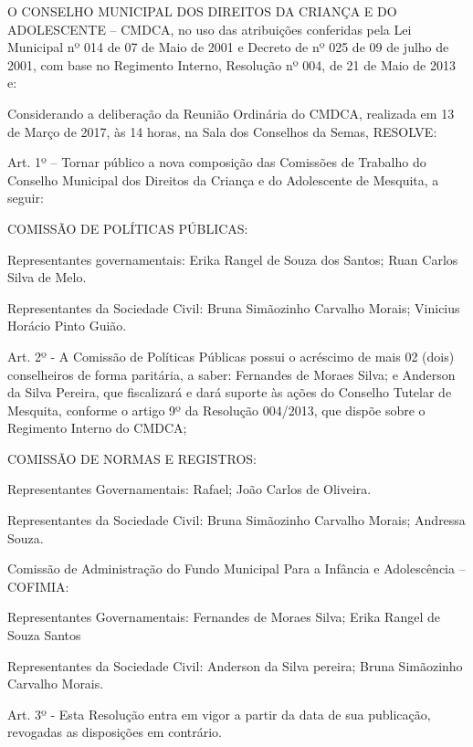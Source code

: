 \documentclass{doliberto}
\begin{document}
O  CONSELHO  MUNICIPAL  DOS  DIREITOS  DA  CRIANÇA  E 
DO  ADOLESCENTE  –  CMDCA,  no  uso  das  atribuições 
conferidas pela Lei Municipal nº 014 de 07 de Maio de 2001 
e  Decreto  de  nº  025  de  09  de  julho  de  2001,  com  base  no 
Regimento  Interno,  Resolução  nº  004,  de  21  de  Maio  de 
2013 e:  

Considerando  a  deliberação  da  Reunião  Ordinária  do 
CMDCA, realizada em 13 de Março de 2017, às 14 horas, na 
Sala dos Conselhos da Semas, RESOLVE:   

Art. 1º – Tornar público a nova composição das Comissões 
de Trabalho do Conselho Municipal dos Direitos da Criança 
e do Adolescente de Mesquita, a seguir: 

COMISSÃO DE POLÍTICAS PÚBLICAS:  
 
Representantes  governamentais:  Erika  Rangel  de  Souza 
dos Santos; Ruan Carlos Silva de Melo.  
 
Representantes  da  Sociedade  Civil:  Bruna  Simãozinho 
Carvalho Morais; Vinicius Horácio Pinto Guião.  
 
Art.  2º  -  A  Comissão  de  Políticas  Públicas  possui  o 
acréscimo  de  mais  02  (dois)  conselheiros  de  forma 
paritária, a saber: Fernandes de Moraes Silva; e Anderson da 
Silva  Pereira,  que  fiscalizará  e  dará  suporte  às  ações  do 
Conselho  Tutelar  de  Mesquita,  conforme  o  artigo  9º  da 
Resolução  004/2013,  que  dispõe  sobre  o  Regimento 
Interno do CMDCA;  
 
COMISSÃO DE NORMAS E REGISTROS: 
 
Representantes  Governamentais: 
Rafael; João Carlos de Oliveira. 
 
Representantes  da  Sociedade  Civil:  Bruna  Simãozinho 
Carvalho Morais; Andressa Souza. 
 
Comissão de Administração do Fundo Municipal Para a 
Infância e Adolescência – COFIMIA: 
 
Representantes  Governamentais:  Fernandes  de  Moraes 
Silva; Erika Rangel de Souza Santos 
 
Representantes  da  Sociedade  Civil:  Anderson  da  Silva 
pereira; Bruna Simãozinho Carvalho Morais. 
 
Art. 3º - Esta Resolução entra em vigor a partir da data de 
sua publicação, revogadas as disposições em contrário. 


\end{document}
